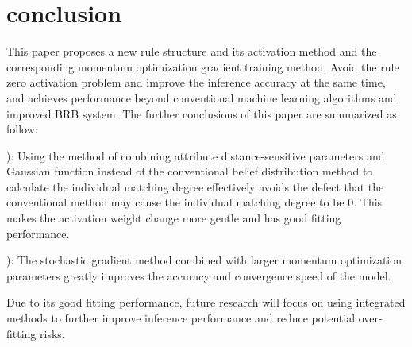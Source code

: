 \documentclass{ieeeaccess}
\begin{document}
\section{conclusion}
This paper proposes a new rule structure and its activation method and the corresponding momentum optimization gradient training method.
Avoid the rule zero activation problem and improve the inference accuracy at the same time,
and achieves performance beyond conventional machine learning algorithms and improved BRB system.
The further conclusions of this paper are summarized as follow:

): Using the method of combining attribute distance-sensitive parameters and Gaussian function instead of
the conventional belief distribution method to calculate the individual matching degree effectively avoids the defect that
the conventional method may cause the individual matching degree to be 0.
This makes the activation weight change more gentle and has good fitting performance.

): The stochastic gradient method combined with larger momentum optimization parameters greatly improves the accuracy and convergence speed of the model.

Due to its good fitting performance, future research will focus on using integrated methods to further improve inference performance and reduce potential over-fitting risks.
\end{document}
